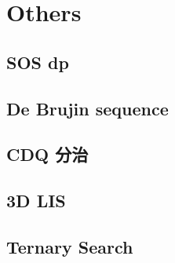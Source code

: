 \documentclass[a4paper,10pt,twocolumn,oneside]{article}
\begin{document}
\section{Others}

\subsection{SOS dp}


%

%

%

%

\subsection{De Brujin sequence}


\subsection{CDQ 分治}


\subsection{3D LIS}


\subsection{Ternary Search}

\end{document}
